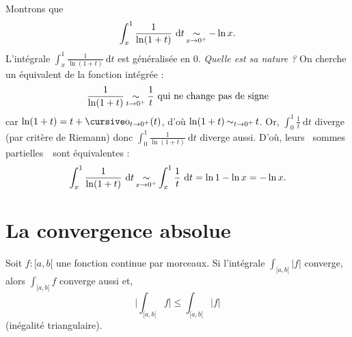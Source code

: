 \begin{exo}
	Montrons que \[
		\int_{x}^{1} \frac{1}{\ln(1+t)}~\mathrm{d}t \operatorname*{\sim}_{x\to 0^+} -\ln x
	.\]
	L'intégrale $\int_{x}^{1} \frac{1}{\ln(1+t)}~\mathrm{d}t$\/ est généralisée en 0.
	{\slshape Quelle est sa nature ?}\/ On cherche un équivalent de la fonction intégrée : \[
		\frac{1}{\ln(1+t)} \operatorname*{\sim}_{t\to 0^+} \frac{1}{t} \text{ qui ne change pas de signe}
	\]
	car $\ln(1+t) = t + \po_{t\to 0^+}(t)$, d'où $\ln(1+t) \operatorname*{\sim}_{t\to 0^+} t$.
	Or, $\int_{0}^{1} \frac{1}{t}~\mathrm{d}t$\/ diverge (par critère de {\sc Riemann}) donc $\int_{0}^{1} \frac{1}{\ln(1+t)}~\mathrm{d}t$\/ diverge aussi.
	D'où, leurs \guillemotleft~sommes partielles~\guillemotright\ sont équivalentes : \[
		\int_{x}^{1} \frac{1}{\ln(1+t)}~\mathrm{d}t \operatorname*{\sim}_{x\to 0^+} \int_{x}^{1} \frac{1}{t}~\mathrm{d}t = \ln 1 - \ln x = -\ln x
	.\]
\end{exo}

\section{La convergence absolue}

\begin{thm}
	Soit $f : [a,b[$\/ une fonction continue par morceaux. Si l'intégrale $\int_{[a,b[} |f|$\/ converge, alors $\int_{[a,b[} f$\/ converge aussi et, \[
		\Big|\int_{[a,b[} f\Big| \le \int_{[a,b[} |f|
	\] (inégalité triangulaire).
\end{thm}

